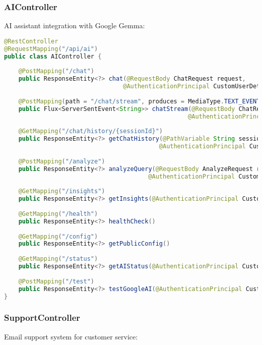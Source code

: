\documentclass[11pt,a4paper]{article}
\begin{document}
\subsubsection{AIController}
AI assistant integration with Google Gemma:

\begin{lstlisting}[language=java, caption=AI Endpoints]
@RestController
@RequestMapping("/api/ai")
public class AIController {
    
    @PostMapping("/chat")
    public ResponseEntity<?> chat(@RequestBody ChatRequest request, 
                                 @AuthenticationPrincipal CustomUserDetails user)
    
    @PostMapping(path = "/chat/stream", produces = MediaType.TEXT_EVENT_STREAM_VALUE)
    public Flux<ServerSentEvent<String>> chatStream(@RequestBody ChatRequest request,
                                                   @AuthenticationPrincipal CustomUserDetails user)
    
    @GetMapping("/chat/history/{sessionId}")
    public ResponseEntity<?> getChatHistory(@PathVariable String sessionId,
                                           @AuthenticationPrincipal CustomUserDetails user)
    
    @PostMapping("/analyze")
    public ResponseEntity<?> analyzeQuery(@RequestBody AnalyzeRequest request,
                                        @AuthenticationPrincipal CustomUserDetails user)
    
    @GetMapping("/insights")
    public ResponseEntity<?> getInsights(@AuthenticationPrincipal CustomUserDetails user)
    
    @GetMapping("/health")
    public ResponseEntity<?> healthCheck()
    
    @GetMapping("/config")
    public ResponseEntity<?> getPublicConfig()
    
    @GetMapping("/status")
    public ResponseEntity<?> getAIStatus(@AuthenticationPrincipal CustomUserDetails user)
    
    @PostMapping("/test")
    public ResponseEntity<?> testGoogleAI(@AuthenticationPrincipal CustomUserDetails user)
}
\end{lstlisting}

\subsubsection{SupportController}
Email support system for customer service:
\end{document}
